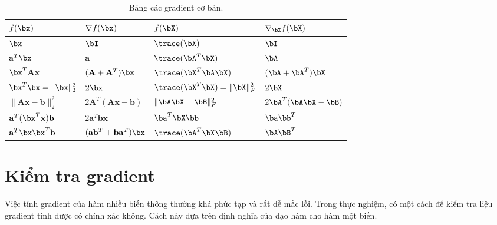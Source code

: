 \begin{table}
\centering
\caption{Bảng các gradient cơ bản.}
\label{tab:commongr}
\setlength{\tabcolsep}{0.5em}
{\normalsize {}
\begin{tabular}{|l|l||l|l|}
\hline
$f(\bx) $                         & $ \nabla f(\bx) $                                         & $f(\bX)$ & $\nabla_{\bX} f(\bX)$\\ \hline
\hline
$ \bx $ & $\bI$ & $\trace(\bX)$ &$ \bI$ \\ \hline
$\mathbf{a}^T \bx $               & $\mathbf{a}$                                              & $\trace(\bA^T\bX)$         & $\bA$ \\ \hline
$\bx^T\mathbf{Ax}$                & $(\mathbf{A} + \mathbf{A}^T) \bx$                         &  $\trace(\bX^T\bA\bX)$        & $(\bA + \bA^T) \bX$ \\ \hline
$\bx^T \bx = \|\bx\|_2^2 $        & $2\bx$                                                    &  $\trace(\bX^T\bX) = \|\bX\|_F^2$        & $2\bX$\\ \hline
$ \|\mathbf{Ax-b} \|_2^2 $        & $ 2\mathbf{A}^T (\mathbf{Ax - b})$                        &  $\|\bA\bX - \bB \|_F^2$        & $2\bA^T(\bA\bX - \bB)$ \\ \hline
$\mathbf{a}^T(\bx^T\mathbf{x})\mathbf{b} $   & $2\mathbf{a}^T\mathbf{bx} $                               &  $\ba^T\bX\bb$        & $\ba\bb^T$ \\ \hline
$\mathbf{a}^T\bx\bx^T\mathbf{b} $ & $ (\mathbf{a}\mathbf{b}^T + \mathbf{b}\mathbf{a}^T) \bx $ &  $\trace(\bA^T\bX\bB)$        & $\bA\bB^T$\\ \hline
\end{tabular}}
\end{table}

\section{Kiểm tra gradient}
\label{sec:check_grad}

Việc tính gradient của hàm nhiều biến thông thường khá phức tạp và rất dễ mắc
lỗi. Trong thực nghiệm, có một cách để kiểm tra liệu gradient tính được có chính
xác không. Cách này dựa trên định nghĩa của đạo hàm cho hàm một biến.

